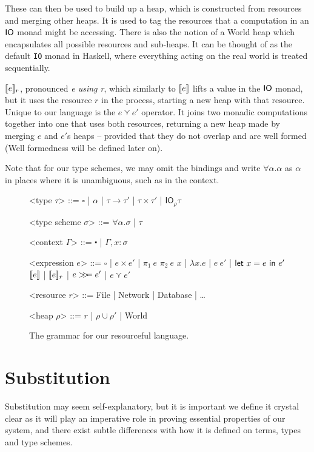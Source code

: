 These can then be used to build up a heap, which is constructed from
resources and merging other heaps. It is used to tag the resources
that a computation in an $\IO$ monad might be accessing. There is also
the notion of a \textsf{World} heap which encapsulates all possible
resources and sub-heaps. It can be thought of as the default
\texttt{IO} monad in Haskell, where everything acting on the real
world is treated sequentially.

$\use{r}{e}$, pronounced \textit{e using r}, which similarly to
$\lift{e}$ lifts a value in the $\IO$ monad, but it uses the resource
$r$ in the process, starting a new heap with that resource. Unique to
our language is the $e \curlyvee e'$ operator. It joins two monadic
computations together into one that uses both resources, returning a
new heap made by merging $e$ and $e'$s heaps -- provided that they do
not overlap and are well formed (Well formedness will be defined later
on).

Note that for our type schemes, we may omit the bindings and write
$\forall \alpha . \alpha$ as $\alpha$ in places where it is unambiguous, such as in the context.

\begin{figure}
\begin{grammar}

  <type $\tau$> ::= $\square$ | $\alpha$ | $\tau \rightarrow \tau'$ | $\tau \times \tau'$ | $\textsf{IO}_\rho \tau$
  
  <type scheme $\sigma$> ::= $\forall \alpha . \sigma$ | $\tau$

  <context $\Gamma$> ::= $\centerdot$ | $\Gamma , x : \sigma$

  <expression $e$> ::= $\square$ | $e \times e'$ | $\pi_1 \ e$ $\pi_2 \ e$
  \alt $x$ | $\lambda x . e$ | $e \ e'$ | $\letin{x = e}{e'}$
  \alt $\lift{e}$ | $\use{r}{e}$ | $e \bind e'$ | $e \curlyvee e'$

  <resource $r$> ::= \textsf{File} | \textsf{Network} |
  \textsf{Database} | \ldots

  <heap $\rho$> ::= $r$ | $\rho \cup \rho'$ | \textsf{World}

\end{grammar}
\caption{The grammar for our resourceful language.} \label{fig:grammar}
\end{figure}

\section{Substitution}
Substitution may seem self-explanatory, but it is important we define
it crystal clear as it will play an imperative role in proving essential
properties of our system, and there exist subtle differences with how it
is defined on terms, types and type schemes.

